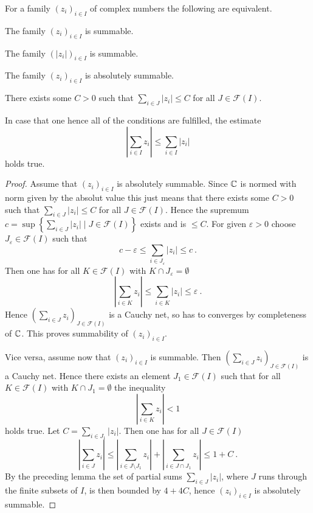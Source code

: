 \begin{proposition}
\label{thm:summability-criteria-family-complex-numbers}
  For a  family $(z_i)_{i\in I}$ of complex numbers the following are equivalent.
  \begin{romanlist}
  \item The family $(z_i)_{i\in I}$ is summable. 
  \item The family $(\left| z_i \right| )_{i\in I}$ is summable.
  \item The family $(z_i)_{i\in I}$ is absolutely summable.

  \item There exists some $C > 0$ such that 
        $\sum_{i\in J}\left| z_i \right| \leq C$ for all $J\in \mathscr{F} (I)$.
  \end{romanlist}
  In case that  one hence all of the conditions are fulfilled, the estimate 
  \[
     \left|  \sum_{i\in I} z_i \right|  \leq \sum_{i\in I}\left| z_i \right| 
  \]
  holds true.
\end{proposition}

\begin{proof}
  Assume that  $(z_i)_{i\in I}$ is absolutely summable. Since $\mathbb{C}$ is normed with norm given by the absolut value 
  this just means that there exists some $C > 0$ such that 
  $\sum_{i\in J}\left| z_i \right| \leq C$ for all $J\in \mathscr{F} (I)$. Hence the supremum 
  $c = \sup \left\{ \sum_{i\in J}\left| z_i \right| \mid J \in \mathscr{F} (I)\right\}$ exists and is $\leq C$. 
  For given $\varepsilon >0$ choose $J_\varepsilon \in \mathscr{F} (I)$ such that 
  \[
        c- \varepsilon \leq \sum_{i\in J_\varepsilon}\left| z_i \right| \leq c \ .
  \]
  Then one has for all $K\in \mathscr{F} (I)$ with $K\cap J_\varepsilon = \emptyset$ 
  \[
     \left| \sum_{i\in K} z_i \right| \leq  \sum_{i\in K} \left| z_i \right| \leq \varepsilon \ .
  \]
  Hence $\left( \sum_{i\in J} z_i \right)_{J \in \mathscr{F} (I)}$ is a Cauchy net, so has to
  converges  by completeness of $\mathbb{C}$. This proves summability of   $(z_i)_{i\in I}$.
  
  Vice versa, assume now that   $(z_i)_{i\in I}$ is summable. Then
  $\left( \sum_{i\in J} z_i \right)_{J \in \mathscr{F} (I)}$ is a Cauchy net. Hence there exists an element 
  $J_1 \in  \mathscr{F} (I)$ such that for all $K\in  \mathscr{F} (I)$ with $K \cap J_1 = \emptyset$  
  the inequality 
  \[
      \left| \sum_{i\in K} z_i \right| < 1 
  \]
  holds true. Let $C = \sum_{i\in J_1} \left| z_i\right|$. Then one has for all $J\in  \mathscr{F} (I)$
  \[
       \left| \sum_{i\in J} z_i \right| \leq  \left| \sum_{i\in J\setminus J_1} z_i \right| +  
       \left| \sum_{i\in J\cap J_1} z_i \right| \leq 1 + C \ .
  \]
  By the preceding lemma the set of partial sums $ \sum_{i\in J} \left| z_i \right|$, where $J$ runs through the 
  finite subsets of $I$, is then bounded by $4 + 4C$, hence  $(z_i)_{i\in I}$ is absolutely summable.
\end{proof}


